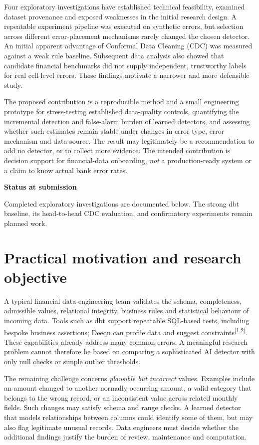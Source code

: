 \documentclass[10pt,a4paper]{article}
\newcommand{\rf}[1]{\textsuperscript{[#1]}}
\begin{document}
Four exploratory investigations have established technical feasibility, examined dataset provenance and exposed weaknesses in the initial research design. A repeatable experiment pipeline was executed on synthetic errors, but selection across different error-placement mechanisms rarely changed the chosen detector. An initial apparent advantage of Conformal Data Cleaning (CDC) was measured against a weak rule baseline. Subsequent data analysis also showed that candidate financial benchmarks did not supply independent, trustworthy labels for real cell-level errors. These findings motivate a narrower and more defensible study.

The proposed contribution is a reproducible method and a small engineering prototype for stress-testing established data-quality controls, quantifying the incremental detection and false-alarm burden of learned detectors, and assessing whether such estimates remain stable under changes in error type, error mechanism and data source. The result may legitimately be a recommendation to add no detector, or to collect more evidence. The intended contribution is decision support for financial-data onboarding, \emph{not} a production-ready system or a claim to know actual bank error rates.

\vspace{4mm}
{\sffamily\bfseries\color{ink} Status at submission}\par
\vspace{1mm}
{\footnotesize Completed exploratory investigations are documented below. The strong dbt baseline, its head-to-head CDC evaluation, and confirmatory experiments remain planned work.}\par
\newpage

\section{Practical motivation and research objective}
A typical financial data-engineering team validates the schema, completeness, admissible values, relational integrity, business rules and statistical behaviour of incoming data. Tools such as dbt support repeatable SQL-based tests, including bespoke business assertions; Deequ can profile data and suggest constraints\rf{1,2}. These capabilities already address many common errors. A meaningful research problem cannot therefore be based on comparing a sophisticated AI detector with only null checks or simple outlier thresholds.

The remaining challenge concerns \emph{plausible but incorrect} values. Examples include an amount changed to another normally occurring amount, a valid category that belongs to the wrong record, or an inconsistent value across related monthly fields. Such changes may satisfy schema and range checks. A learned detector that models relationships between columns could identify some of them, but may also flag legitimate unusual records. Data engineers must decide whether the additional findings justify the burden of review, maintenance and computation.
\end{document}
